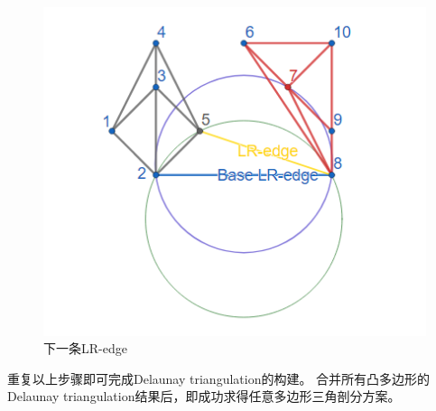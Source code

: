 \begin{figure}[htbp]
\begin{minipage}{0.32\textwidth}
        \includegraphics[width=\textwidth]
        {figures/DT8.png}
        \caption{下一条LR-edge}
    \end{minipage}
\end{figure}



重复以上步骤即可完成Delaunay triangulation的构建。
合并所有凸多边形的Delaunay triangulation结果后，即成功求得任意多边形三角剖分方案。




